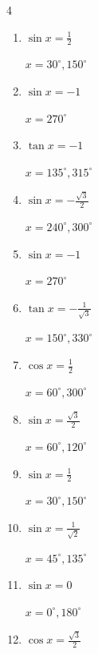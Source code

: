 \begin{multicols}{4}
\begin{enumerate}
        $\displaystyle x = 30^{\circ} , 330^{\circ}$

  \item $\displaystyle \sin{x}  = \frac{1}{2}$

        $\displaystyle x = 30^{\circ} , 150^{\circ}$

  \item $\displaystyle \sin{x}  = -1$

        $\displaystyle x = 270^{\circ}$

  \item $\displaystyle \tan{x}  = -1$

        $\displaystyle x = 135^{\circ} , 315^{\circ}$

  \item $\displaystyle \sin{x}  = -\frac{\sqrt{3}}{2}$

        $\displaystyle x = 240^{\circ} , 300^{\circ}$

  \item $\displaystyle \sin{x}  = -1$

        $\displaystyle x = 270^{\circ}$

  \item $\displaystyle \tan{x}  = -\frac{1}{\sqrt{3}}$

        $\displaystyle x = 150^{\circ} , 330^{\circ}$

  \item $\displaystyle \cos{x}  = \frac{1}{2}$

        $\displaystyle x = 60^{\circ} , 300^{\circ}$

  \item $\displaystyle \sin{x}  = \frac{\sqrt{3}}{2}$

        $\displaystyle x = 60^{\circ} , 120^{\circ}$

  \item $\displaystyle \sin{x}  = \frac{1}{2}$

        $\displaystyle x = 30^{\circ} , 150^{\circ}$

  \item $\displaystyle \sin{x}  = \frac{1}{\sqrt{2}}$

        $\displaystyle x = 45^{\circ} , 135^{\circ}$

  \item $\displaystyle \sin{x}  = 0$

        $\displaystyle x = 0^{\circ} , 180^{\circ}$

  \item $\displaystyle \cos{x}  = \frac{\sqrt{3}}{2}$


\end{enumerate}
\end{multicols}
